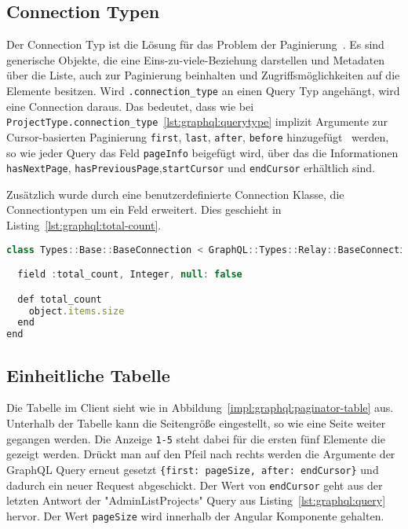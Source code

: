\subsection{Connection Typen}
\label{graphql:connections}
Der Connection Typ ist die Lösung für das Problem der Paginierung~\cite{graphql-connection-concept}.
Es sind generische Objekte, die eine Eins-zu-viele-Beziehung darstellen und Metadaten über die Liste, auch zur Paginierung beinhalten und Zugriffsmöglichkeiten auf die Elemente besitzen.
Wird \lstinline|.connection_type| an einen Query Typ angehängt, wird eine Connection daraus. 
Das bedeutet, dass wie bei \lstinline|ProjectType.connection_type|~\ref{lst:graphql:querytype} implizit Argumente zur Cursor-basierten Paginierung \lstinline|first|, \lstinline|last|, \lstinline|after|, \lstinline|before| hinzugefügt~\cite{graphql-relay-connection} werden, so wie jeder Query das Feld \lstinline|pageInfo| beigefügt wird, über das die Informationen \lstinline|hasNextPage|, \lstinline|hasPreviousPage|,\lstinline|startCursor| und \lstinline|endCursor| erhältlich sind. 

Zusätzlich wurde durch eine benutzerdefinierte Connection Klasse, die Connectiontypen um ein Feld erweitert.
Dies geschieht in Listing~\ref{lst:graphql:total-count}.

\begin{lstlisting}[language=JavaScript,float=h!,caption={Benutzerdefinierte Connection Klasse mit hinzugefügtem Feld}, label={lst:graphql:total-count}]
class Types::Base::BaseConnection < GraphQL::Types::Relay::BaseConnection

  field :total_count, Integer, null: false

  def total_count
    object.items.size
  end
end
\end{lstlisting}

\subsection{Einheitliche Tabelle}
\label{impl:paginator-component}
Die Tabelle im Client sieht wie in Abbildung~\ref{impl:graphql:paginator-table} aus. Unterhalb der Tabelle kann die Seitengröße eingestellt, so wie eine Seite weiter gegangen werden. Die Anzeige \lstinline|1-5| steht dabei für die ersten fünf Elemente die gezeigt werden. Drückt man auf den Pfeil nach rechts werden die Argumente der GraphQL Query erneut gesetzt \lstinline|{first: pageSize, after: endCursor}| und dadurch ein neuer Request abgeschickt.
Der Wert von \lstinline|endCursor| geht aus der letzten Antwort der "AdminListProjects" Query aus Listing~\ref{lst:graphql:query} hervor. Der Wert \lstinline|pageSize| wird innerhalb der Angular Komponente gehalten. 

